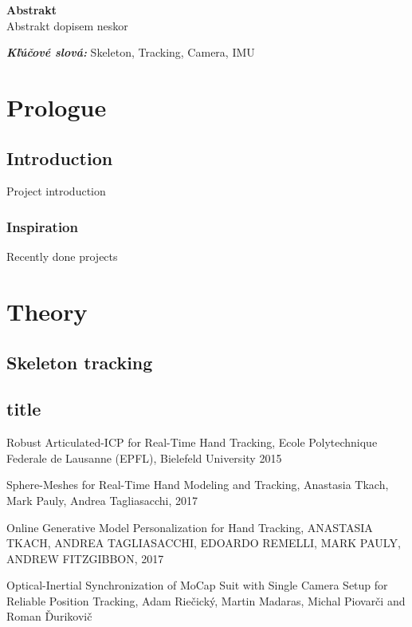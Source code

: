 \documentclass[12pt,a4paper]{report}
\theoremstyle{definition}
\theoremstyle{remark}
\begin{document}
\newpage

\flushleft\textbf{\Huge Abstrakt}\\ \hfill \break
\justify %
Abstrakt dopisem neskor\\ \newline

\textbf{\textit{Kľúčové slová: }} Skeleton, Tracking, Camera, IMU

\newpage



\tableofcontents
\listoffigures

\chapter{Prologue}
\section{Introduction}

\justify %

Project introduction

\subsection{Inspiration}
Recently done projects
\chapter{Theory}
\section{Skeleton tracking}
\section{title}

\begin{thebibliography}{99}


Robust Articulated-ICP for Real-Time Hand Tracking, Ecole Polytechnique Federale de Lausanne (EPFL), Bielefeld University 2015

Sphere-Meshes for Real-Time Hand Modeling and Tracking, Anastasia Tkach, Mark Pauly, Andrea Tagliasacchi, 2017

Online Generative Model Personalization for Hand Tracking, ANASTASIA TKACH, ANDREA TAGLIASACCHI, EDOARDO REMELLI, MARK PAULY, ANDREW FITZGIBBON, 2017

Optical-Inertial Synchronization of MoCap Suit with Single Camera Setup for Reliable Position Tracking, Adam Riečický, Martin Madaras, Michal Piovarči and Roman Ďurikovič



\end{thebibliography}
\end{document}

